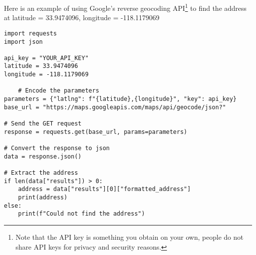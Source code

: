 Here is an example of using Google's reverse geocoding API\footnote{Note that the API key is something you obtain on your own, people do not share API keys for privacy and security reasons.} to find the
address at latitude = 33.9474096, longitude = -118.1179069


\begin{verbatim}
import requests
import json

api_key = "YOUR_API_KEY"
latitude = 33.9474096
longitude = -118.1179069

    # Encode the parameters
parameters = {"latlng": f"{latitude},{longitude}", "key": api_key}
base_url = "https://maps.googleapis.com/maps/api/geocode/json?"

# Send the GET request
response = requests.get(base_url, params=parameters)

# Convert the response to json
data = response.json()

# Extract the address
if len(data["results"]) > 0:
    address = data["results"][0]["formatted_address"]
    print(address)
else:
    print(f"Could not find the address")

\end{verbatim}